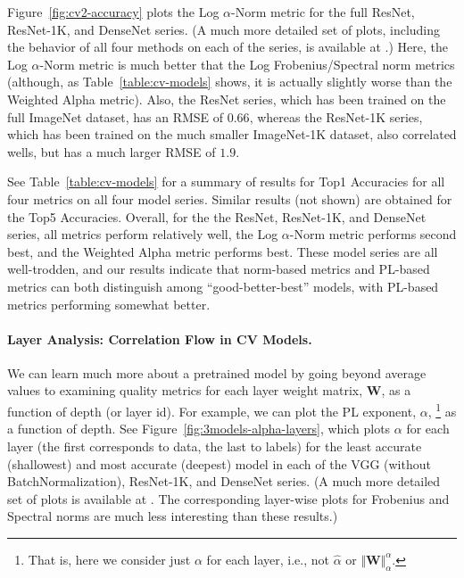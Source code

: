 Figure~\ref{fig:cv2-accuracy} plots the 
Log $\alpha$-Norm
metric for the full ResNet, ResNet-1K, and DenseNet series.
(A much more detailed set of plots, including the behavior of all four methods on each of the series, is available at \cite{XXX-WEB-LINK}.)
Here, the Log $\alpha$-Norm metric is much better that the Log Frobenius/Spectral norm metrics (although, as Table~\ref{table:cv-models} shows, it is actually slightly worse than the Weighted Alpha metric).
Also, the ResNet series, which has been trained on the full ImageNet dataset, has an RMSE of $0.66$, whereas the ResNet-1K series, which has been trained on the much smaller ImageNet-1K dataset, also correlated wells, but has a much larger RMSE of $1.9$.

See Table~\ref{table:cv-models} for a summary of results for Top1 Accuracies for all four metrics on all four model series.
Similar results (not shown) are obtained for the Top5 Accuracies.
Overall, for the the ResNet, ResNet-1K, and DenseNet series, all metrics perform relatively well, the Log $\alpha$-Norm metric performs second best, and the Weighted Alpha metric performs best. 
These model series are all well-trodden, and our results indicate that norm-based metrics and PL-based metrics can both distinguish among ``good-better-best'' models, with PL-based metrics performing somewhat better. 


\paragraph{Layer Analysis: Correlation Flow in CV Models.}

We can learn much more about a pretrained model by going beyond average values to examining quality metrics for each layer weight matrix, $\mathbf{W}$, as a function of depth (or layer id).  %
For example, we can 
plot the PL exponent, $\alpha$,%
\footnote{That is, here we consider just $\alpha$ for each layer, i.e., not $\hat{\alpha}$ or $\Vert\mathbf{W}\Vert^{\alpha}_{\alpha}$.} 
as a function of depth.
%
See Figure~\ref{fig:3models-alpha-layers}, which plots $\alpha$ for each layer (the first corresponds to data, the last to labels) for the least accurate (shallowest) and most accurate (deepest) model in each of the VGG (without BatchNormalization), ResNet-1K, and DenseNet series.
(A much more detailed set of plots is available at \cite{XXX-WEB-LINK}.  The corresponding layer-wise plots for Frobenius and Spectral norms are much less interesting than these results.)

